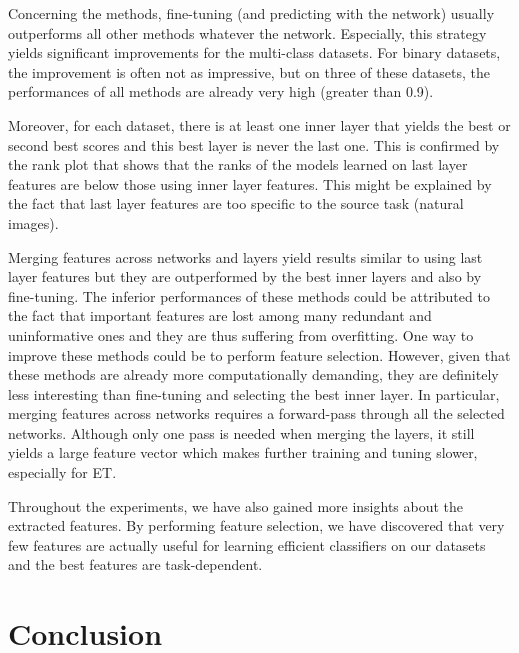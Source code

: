 Concerning the methods, fine-tuning (and predicting with the network) usually outperforms all other methods whatever the network. Especially, this strategy yields significant improvements for the multi-class datasets. For binary datasets, the improvement is often not as impressive, but on three of these datasets, the performances of all methods are already very high (greater than 0.9).

Moreover, for each dataset, there is at least one inner layer that yields the best or second best scores and this best layer is never the last one. This is confirmed by the rank plot that shows that the ranks of the models learned on last layer features are below those using inner layer features. This might be explained by the fact that last layer features are too specific to the source task (natural images).

Merging features across networks and layers yield results similar to using last layer features but they are outperformed by the best inner layers and also by fine-tuning. The inferior performances of these methods could be attributed to the fact that important features are lost among many redundant and uninformative ones and they are thus suffering from overfitting. One way to improve these methods could be to perform feature selection. However, given that these methods are already more computationally demanding, they are definitely less interesting than fine-tuning and selecting the best inner layer. In particular, merging features across networks requires a forward-pass through all the selected networks. Although only one pass is needed when merging the layers, it still yields a large feature vector which makes further training and tuning slower, especially for ET.

Throughout the experiments, we have also gained more insights about the extracted features. By performing feature selection, we have discovered that very few features are actually useful for learning efficient classifiers on our datasets and the best features are task-dependent.




\section{Conclusion}


